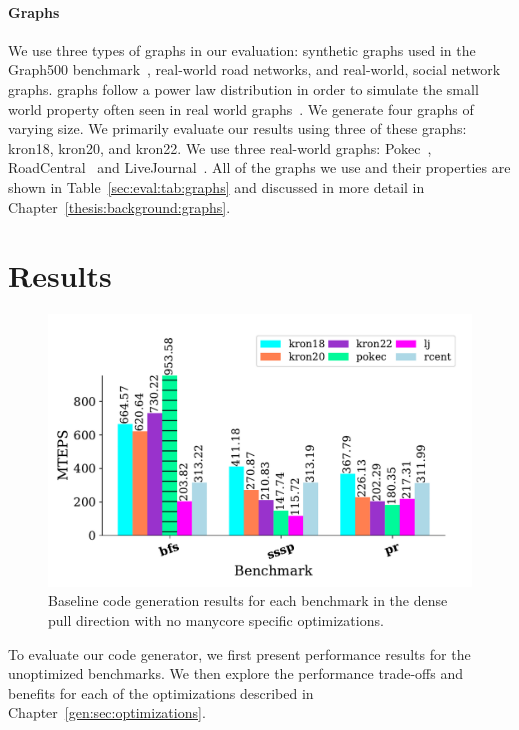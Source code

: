 \paragraph{Graphs} We use three types of graphs in our evaluation: synthetic \kron graphs used in the Graph500 benchmark~\cite{murphy2010graph500}, real-world road networks, and real-world, social network graphs.
\kron graphs follow a power law distribution in order to simulate the small world property often seen in real world graphs~\cite{leskovec2010kronecker}.
We generate four \kron graphs of varying size. 
We primarily evaluate our results using three of these graphs: kron18, kron20, and kron22.
We use three real-world graphs: Pokec~\cite{pokec}, RoadCentral~\cite{davis2011university} and LiveJournal~\cite{lj}.
All of the graphs we use and their properties are shown in Table~\ref{sec:eval:tab:graphs} and discussed in more detail in Chapter~\ref{thesis:background:graphs}.


\section{Results}
\begin{figure}[h!]
    \centering
    \includegraphics[scale = 0.6]{graphit-figures/baseline.pdf}
    \caption{Baseline code generation results for each benchmark in the dense pull direction with no manycore specific optimizations.}
    \label{pap:generals:sec:eval:fig:baseline}
\end{figure}

To evaluate our code generator, we first present performance results for the unoptimized benchmarks. 
We then explore the performance trade-offs and benefits for each of the optimizations described in Chapter~\ref{gen:sec:optimizations}.

